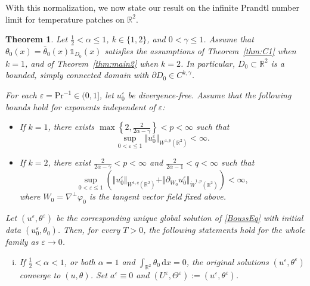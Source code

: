 \documentclass[reqno,11pt,a4paper]{amsart}
\newtheorem{theorem}{Theorem}[section]
\newcommand{\dd}{\mathrm{d}}
\begin{document}
With this normalization, we now state our result
on the infinite Prandtl number limit
for temperature patches on $\mathbb R^2$.
\begin{theorem}\label{thm:infinite-Prandtl}
Let $\frac12<\alpha\leq1$, $k\in\{1,2\}$,
and $0<\gamma\leq1$.
Assume that $\theta_0(x)=\bar\theta_0(x)\mathds{1}_{D_0}(x)$ 
satisfies the assumptions
of Theorem~\ref{thm:C1} when $k=1$,
and of Theorem~\ref{thm:main2} when $k=2$.
In particular, $D_0\subset\mathbb R^2$ is a bounded,
simply connected domain with
$\partial D_0\in C^{k,\gamma}$.

For each $\varepsilon=\mathrm{Pr}^{-1}\in(0,1]$,
let $u_0^\varepsilon$ be divergence-free.
Assume that the following bounds hold for exponents
independent of $\varepsilon$:
\begin{itemize}
\item
If $k=1$, there exists
$\max\left\{2,\frac{2}{2\alpha-\gamma}\right\}<p<\infty$
such that
\[
  \sup_{0<\varepsilon\leq1}
  \Vert u_0^\varepsilon\Vert _{W^{1,p}(\mathbb R^2)}
  <\infty.
\]

\item
If $k=2$, there exist
$\frac{2}{2\alpha-\gamma}<p<\infty$ and $\frac{2}{2\alpha-1}<q<\infty$
such that
\[
  \sup_{0<\varepsilon\leq1}
  \left(
    \Vert u_0^\varepsilon\Vert _{W^{1,q}(\mathbb R^2)}
    +
    \Vert \partial_{W_0}u_0^\varepsilon
      \Vert _{\dot W^{1,p}(\mathbb R^2)}
  \right)
  <\infty,
\]
where $W_0=\nabla^\perp\varphi_0$
is the tangent vector field %
fixed above.
\end{itemize}

Let $(u^\varepsilon,\theta^\varepsilon)$
be the corresponding unique global solution
of \eqref{BoussEq} with initial data
$(u_0^\varepsilon,\theta_0)$.
Then, for every $T>0$, the following statements hold for the whole family as
$\varepsilon\to0$.
\begin{enumerate}[(i)]
\item
If $\frac12<\alpha<1$, or both $\alpha=1$ and
$\int_{\mathbb R^2}\theta_0\,\dd x=0$, the original solutions
$(u^\varepsilon,\theta^\varepsilon)$ converge to $(u,\theta)$.
Set $a^\varepsilon\equiv0$ and
$(U^\varepsilon,\Theta^\varepsilon)
:=(u^\varepsilon,\theta^\varepsilon)$.


\end{enumerate}
\end{theorem}
\end{document}
